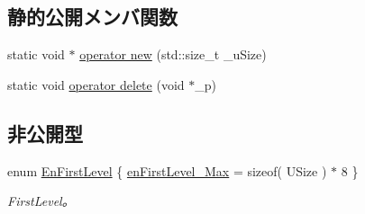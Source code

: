\subsection*{静的公開メンバ関数}
\begin{DoxyCompactItemize}
\item 
static void $\ast$ \hyperlink{class_c_mem_allocator_a48c0568fb21eb63978af2137aab23ad6}{operator new} (std\+::size\+\_\+t \+\_\+u\+Size)
\item 
static void \hyperlink{class_c_mem_allocator_af156badb5f8380a0d9ee76afad22c496}{operator delete} (void $\ast$\+\_\+p)
\end{DoxyCompactItemize}
\subsection*{非公開型}
\begin{DoxyCompactItemize}
\item 
enum \hyperlink{class_c_mem_allocator_a780a1a1225569ea2d2a8b7db9f9c7089}{En\+First\+Level} \{ \hyperlink{class_c_mem_allocator_a780a1a1225569ea2d2a8b7db9f9c7089ab914654c48cd4a1779f988840ea2a151}{en\+First\+Level\+\_\+\+Max} = sizeof( U\+Size ) $\ast$ 8
 \}\begin{DoxyCompactList}\small\item\em First\+Level。 \end{DoxyCompactList}
\end{DoxyCompactItemize}
